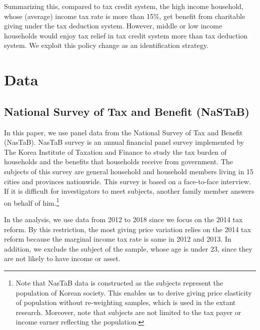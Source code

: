 \documentclass[ review  , 3p ]{elsarticle}
\begin{document}
  Summarizing this, compared to tax credit system, the high income household, whose (average) income tax rate is more than 15\%, get benefit from charitable giving under the tax deduction system. However, middle or low income households would enjoy tax relief in tax credit system more than tax deduction system. We exploit this policy change as an identification strategy.

  \hypertarget{data}{%
  \section{Data}\label{data}}

  \hypertarget{national-survey-of-tax-and-benefit-nastab}{%
  \subsection{National Survey of Tax and Benefit (NaSTaB)}\label{national-survey-of-tax-and-benefit-nastab}}

  In this paper, we use panel data from the National Survey of Tax and Benefit (NasTaB).
  NasTaB survey is an annual financial panel survey
  implemented by The Korea Institute of Taxation and Finance
  to study the tax burden of households and the benefits that households receive from government.
  The subjects of this survey are general household and household members living in 15 cities
  and provinces nationwide.
  This survey is based on a face-to-face interview.
  If it is difficult for investigators to meet subjects, another family member answers on behalf of him.\footnote{Note that NasTaB data is constructed as the subjects represent the population of Korean society. This enables us to derive giving price elasticity of population without re-weighting samples, which is used in the extant research. Moreover, note that subjects are not limited to the tax payer or income earner reflecting the population.}

  In the analysis, we use data from 2012 to 2018 since
  \color{red}
  we focus on the 2014 tax reform.
  By this restriction, the most giving price variation relies on the 2014 tax reform because
  the marginal income tax rate is same in 2012 and 2013.
  \color{black}
  In addition, we exclude the subject of the sample, whose age is under 23, since they are not likely to have income or asset.
\end{document}
